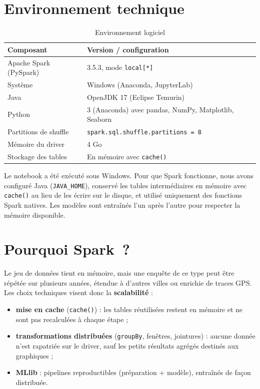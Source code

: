 \documentclass[12pt,a4paper]{report}
\newcommand{\code}[1]{\texttt{\small #1}}
\newcommand{\1}{\mathbf{1}}
\begin{document}
\section{Environnement technique}
\begin{table}[H]
\centering
\caption{Environnement logiciel}\label{tab:env}
\begin{tabular}{@{}ll@{}}
\toprule
\textbf{Composant} & \textbf{Version / configuration} \\
\midrule
Apache Spark (PySpark) & 3.5.3, mode \code{local[*]} \\
Système & Windows (Anaconda, JupyterLab) \\
Java & OpenJDK 17 (Eclipse Temurin) \\
Python & 3 (Anaconda) avec pandas, NumPy, Matplotlib, Seaborn \\
Partitions de shuffle & \code{spark.sql.shuffle.partitions = 8} \\
Mémoire du driver & 4 Go \\
Stockage des tables & En mémoire avec \code{cache()} \\
\bottomrule
\end{tabular}
\end{table}

\begin{attention}
Le notebook a été exécuté sous Windows. Pour que Spark fonctionne, nous avons configuré Java (\code{JAVA\_HOME}), conservé les tables intermédiaires en mémoire avec \code{cache()} au lieu de les écrire sur le disque, et utilisé uniquement des fonctions Spark natives. Les modèles sont entraînés l'un après l'autre pour respecter la mémoire disponible.
\end{attention}

\section{Pourquoi Spark~?}
Le jeu de données tient en mémoire, mais une enquête de ce type peut être répétée sur plusieurs années, étendue à d'autres villes ou enrichie de traces GPS. Les choix techniques visent donc la \textbf{scalabilité} :
\begin{itemize}
  \item \textbf{mise en cache} (\code{cache()}) : les tables réutilisées restent en mémoire et ne sont pas recalculées à chaque étape ;
  \item \textbf{transformations distribuées} (\code{groupBy}, fenêtres, jointures) : aucune donnée n'est rapatriée sur le driver, sauf les petits résultats agrégés destinés aux graphiques ;
  \item \textbf{MLlib} : pipelines reproductibles (préparation + modèle), entraînés de façon distribuée.
\end{itemize}
\end{document}

